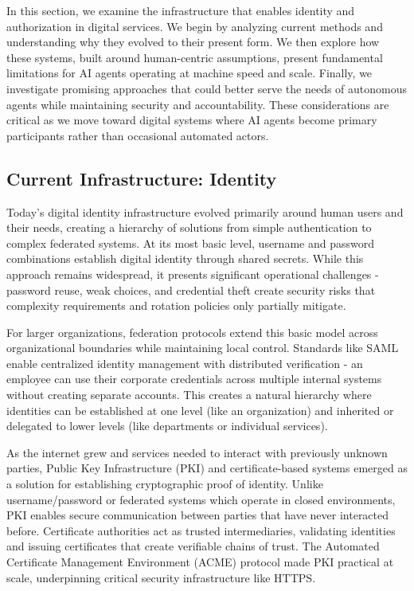 \documentclass{article}
\begin{document}
In this section, we examine the infrastructure that enables identity and authorization in digital services. We begin by analyzing current methods and understanding why they evolved to their present form. We then explore how these systems, built around human-centric assumptions, present fundamental limitations for AI agents operating at machine speed and scale. Finally, we investigate promising approaches that could better serve the needs of autonomous agents while maintaining security and accountability. These considerations are critical as we move toward digital systems where AI agents become primary participants rather than occasional automated actors.

\subsection{Current Infrastructure: Identity}
\label{subsec:identity_current}


    
Today's digital identity infrastructure evolved primarily around human users and their needs, creating a hierarchy of solutions from simple authentication to complex federated systems. At its most basic level, username and password combinations establish digital identity through shared secrets. While this approach remains widespread, it presents significant operational challenges - password reuse, weak choices, and credential theft create security risks that complexity requirements and rotation policies only partially mitigate.

For larger organizations, federation protocols extend this basic model across organizational boundaries while maintaining local control. Standards like SAML enable centralized identity management with distributed verification - an employee can use their corporate credentials across multiple internal systems without creating separate accounts. This creates a natural hierarchy where identities can be established at one level (like an organization) and inherited or delegated to lower levels (like departments or individual services).

As the internet grew and services needed to interact with previously unknown parties, Public Key Infrastructure (PKI) and certificate-based systems emerged as a solution for establishing cryptographic proof of identity. Unlike username/password or federated systems which operate in closed environments, PKI enables secure communication between parties that have never interacted before. Certificate authorities act as trusted intermediaries, validating identities and issuing certificates that create verifiable chains of trust. The Automated Certificate Management Environment (ACME) protocol made PKI practical at scale, underpinning critical security infrastructure like HTTPS.
\end{document}
